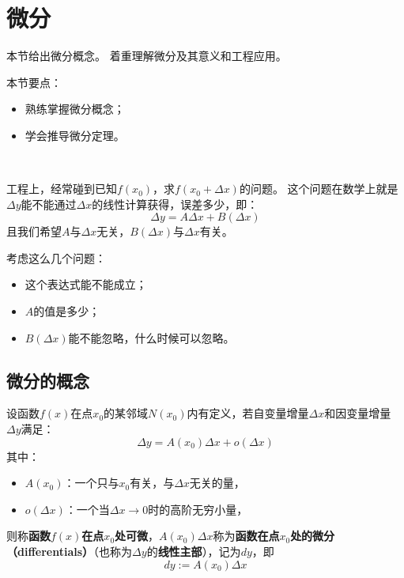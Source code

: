 \section{微分}

本节给出微分概念。
着重理解微分及其意义和工程应用。

本节要点：
\begin{itemize}
    \item 熟练掌握微分概念；
    \item 学会推导微分定理。
\end{itemize}

~

工程上，经常碰到已知$f\left( x_0 \right) $，求$f\left( x_0+\Delta x \right) $的问题。
这个问题在数学上就是$\Delta y$能不能通过$\Delta x$的线性计算获得，误差多少，即：
\[
\Delta y=A\Delta x+B\left( \Delta x \right)
\]
且我们希望$A$与$\Delta x$无关，$B\left( \Delta x \right) $与$\Delta x$有关。

考虑这么几个问题：
\begin{itemize}
    \item 这个表达式能不能成立；
    \item $A$的值是多少；
    \item $B\left( \Delta x \right) $能不能忽略，什么时候可以忽略。
\end{itemize}

\subsection{微分的概念}

\begin{definition}[微分]
设函数$f\left( x \right) $在点$x_0$的某邻域$N\left( x_0 \right) $内有定义，若自变量增量$\Delta x$和因变量增量$\Delta y$满足：
\[
\Delta y=A\left( x_0 \right) \Delta x+o\left( \Delta x \right)
\]
其中：
\begin{itemize}
    \item $A\left( x_0 \right) $：一个只与$x_0$有关，与$\Delta x$无关的量，
    \item $o\left( \Delta x \right) $：一个当$\Delta x\rightarrow 0$时的高阶无穷小量，
\end{itemize}
则称{\bf 函数$f\left( x \right) $在点$x_0$处可微}，$A\left( x_0 \right) \Delta x$称为{\bf 函数在点$x_0$处的微分（differentials）}（也称为$\Delta y$的{\bf 线性主部}），记为$dy$，即
\[
dy:=A\left( x_0 \right) \Delta x
\]
\end{definition}

